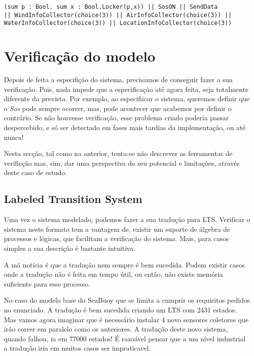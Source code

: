 \documentclass[a4paper,11pt]{article}
\begin{document}
\begin{lstlisting}
(sum p : Bool. sum x : Bool.Locker(p,x)) || SosON || SendData 
|| WindInfoCollector(choice(3)) || AirInfoCollector(choice(3)) || 
WaterInfoCollector(choice(3)) || LocationInfoCollector(choice(3))

\end{lstlisting}

\section{Verificação do modelo}

Depois de feita a especifição do sistema, precisamos de conseguir fazer a sua verificação.
Pois, nada impede que a especificação até agora feita, seja totalmente diferente
da prevista. Por exemplo, ao especifiicar o sistema, queremos definir que o \emph{Sos} pode 
sempre ocorrer, mas, pode acontecer que acabemos por definir o contrário. Se não houvesse
verificação, esse problema criado poderia passar despercebido, e só ser detectado em
fases mais tardias da implementação, ou até nunca!\par
Nesta secção, tal como na anterior, tenta-se não descrever as ferramentas de verificção mas,
sim, dar uma perspectiva do seu potencial e limitações, através deste caso de estudo. 

\subsection{Labeled Transition System}

Uma vez o sistema modelado, podemos fazer a sua tradução para LTS. 
Verificar o sistema neste formato tem a vantagem de, existir um suporte de álgebra de processos
e lógicas, que facilitam a verificação do sistema. Mais, para casos simples a sua descrição
é bastante intuitiva. \par

A má notícia é que a tradução nem sempre é bem sucedida. Podem existir casos onde a tradução não é feita
em tempo útil, ou então, não existe memória suficiente para esse processo. \par

No caso do modelo base do SeaBuoy que se limita a cumprir os requisitos pedidos no enunciado. A tradução
é bem sucedida criando um LTS com 2431 estados. Mas vamos agora imaginar que 
é necessário instalar 4 novo sensores coletores que irão correr em paralelo como os anteriores.
A tradução deste novo sistema, quando falhou, ia em 77000 estados! 
É razoável pensar que a um nível industrial a tradução iria em muitos casos ser impraticavel. \par
\end{document}
